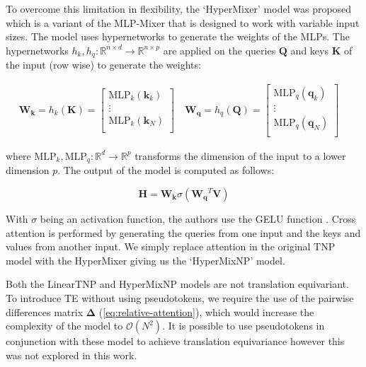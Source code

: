 \documentclass[../../main.tex]{subfiles}
\begin{document}
To overcome this limitation in flexibility, the `HyperMixer'  model \parencite{mai2023hypermixer} was proposed which is a variant of the MLP-Mixer that is designed to work with variable input sizes. The model uses hypernetworks \parencite{ha2016hypernetworks} to generate the weights of the MLPs. The hypernetworks $h_k, h_q : \mathbb{R}^{n \times d} \rightarrow \mathbb{R}^{n \times p}$ are applied on the queries $\bm{Q}$ and keys $\bm{K}$ of the input (row wise) to generate the weights:

\begin{align}
    \bm{W_k} = h_k(\bm{K}) =  \begin{bmatrix}
        \text{MLP}_k(\bm{k}_k) \\
        \vdots \\
        \text{MLP}_k(\bm{k}_N) \\
    \end{bmatrix} \quad
    \bm{W_q} = h_q(\bm{Q}) =  \begin{bmatrix}
        \text{MLP}_q(\bm{q}_k) \\
        \vdots \\
        \text{MLP}_q(\bm{q}_N) \\
    \end{bmatrix} \quad
\end{align}

where $\text{MLP}_k, \text{MLP}_q: \mathbb{R}^d \rightarrow \mathbb{R}^p$ transforms the dimension of the input to a lower dimension $p$. The output of the model is computed as follows:

\begin{equation}
    \bm{H} = \bm{W_k} \sigma(\bm{W_q}^T \bm{V})
\end{equation}

With $\sigma$ being an activation function, the authors use the GELU function \parencite{hendrycks2023gaussian}.
Cross attention is performed by generating the queries from one input and the keys and values from another input. We simply replace attention in the original TNP model with the HyperMixer giving us the `HyperMixNP' model. 

\begin{note}
    Both the LinearTNP and HyperMixNP models are not translation equivariant. To introduce TE without using pseudotokens, we require the use of the pairwise differences matrix $\bm{\Delta}$ (\autoref{eq:relative-attention}), which would increase the complexity of the model to $\mathcal{O}(N^2)$. It is possible to use pseudotokens in conjunction with these model to achieve translation equivariance however this was not explored in this work.
\end{note}
\end{document}
